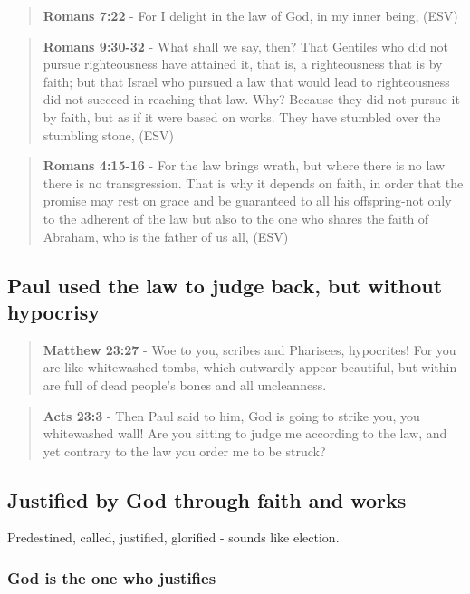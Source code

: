 \documentclass[11pt]{article}
\begin{document}
\begin{quote}
\textbf{Romans 7:22} - For I delight in the law of God, in my inner being, (ESV)
\end{quote}

\begin{quote}
\textbf{Romans 9:30-32} - What shall we say, then? That Gentiles who did not pursue righteousness have attained it, that is, a righteousness that is by faith; but that Israel who pursued a law that would lead to righteousness did not succeed in reaching that law. Why? Because they did not pursue it by faith, but as if it were based on works. They have stumbled over the stumbling stone, (ESV)
\end{quote}

\begin{quote}
\textbf{Romans 4:15-16} - For the law brings wrath, but where there is no law there is no transgression. That is why it depends on faith, in order that the promise may rest on grace and be guaranteed to all his offspring-not only to the adherent of the law but also to the one who shares the faith of Abraham, who is the father of us all, (ESV)
\end{quote}

\subsection{Paul used the law to judge back, but without hypocrisy}
\label{sec:orgc91e982}
\begin{quote}
\textbf{Matthew 23:27} - Woe to you, scribes and Pharisees, hypocrites! For you are like whitewashed tombs, which outwardly appear beautiful, but within are full of dead people's bones and all uncleanness.
\end{quote}

\begin{quote}
\textbf{Acts 23:3} - Then Paul said to him, God is going to strike you, you whitewashed wall! Are you sitting to judge me according to the law, and yet contrary to the law you order me to be struck?
\end{quote}

\subsection{Justified by God through faith and works}
\label{sec:orgcb76215}
Predestined, called, justified, glorified - sounds like election.

\subsubsection{God is the one who justifies}
\label{sec:orgd7e3d3e}
\end{document}
